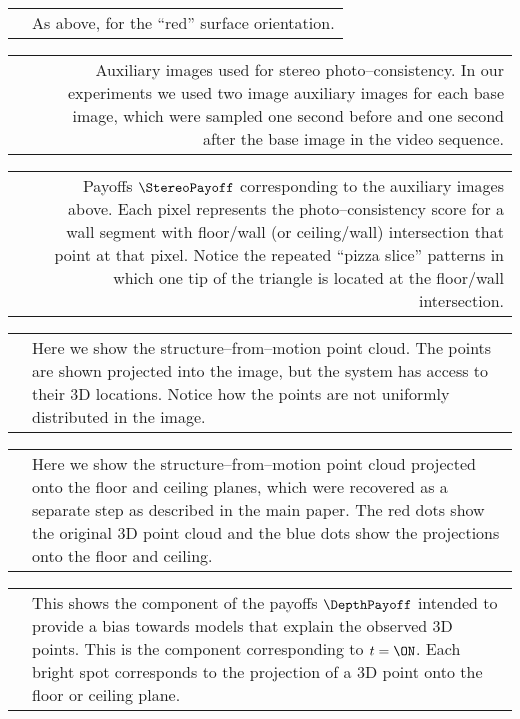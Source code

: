 \begin{tabular}{IT}
   &
  As above, for the ``red'' surface orientation. \\
\end{tabular}
\qquad

\begin{tabular}{IIN}
   &
   &
  Auxiliary images used for stereo photo--consistency. In our
  experiments we used two image auxiliary images for each base image,
  which were sampled one second before and one second after the base
  image in the video sequence.
\end{tabular}
\qquad

\begin{tabular}{IIN}
   &
   &
  Payoffs $\StereoPayoff$ corresponding to the auxiliary images
  above. Each pixel represents the photo--consistency score for a wall
  segment with floor/wall (or ceiling/wall) intersection that point
  at that pixel. Notice the repeated ``pizza slice'' patterns in which
  one tip of the triangle is located at the floor/wall intersection. \\
\end{tabular}
\qquad

\begin{tabular}{IT}
   &
  Here we show the structure--from--motion point cloud. The points are
  shown projected into the image, but the system has access to their
  3D locations. Notice how the points are not uniformly distributed in
  the image.
\end{tabular}
\qquad

\begin{tabular}{IT}
   &
  Here we show the structure--from--motion point cloud projected onto
  the floor and ceiling planes, which were recovered as a separate
  step as described in the main paper. The red dots show the original
  3D point cloud and the blue dots show the projections onto the floor
  and ceiling.\\
\end{tabular}
\qquad

\begin{tabular}{IT}
   &
  This shows the component of the payoffs $\DepthPayoff$ intended to
  provide a bias towards models that explain the observed 3D
  points. This is the component corresponding to $t=\ON$. Each bright
  spot corresponds to the projection of a 3D point onto the floor or
  ceiling plane.
\end{tabular}
\qquad

